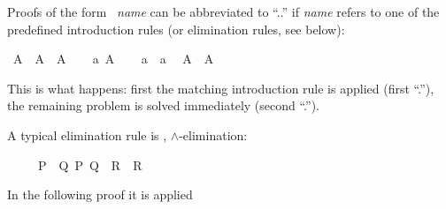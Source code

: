 \begin{isabellebody}
\begin{isamarkuptext}
Proofs of the form ~\emph{name}
can be abbreviated to ``..'' if \emph{name} refers to one of the
predefined introduction rules (or elimination rules, see below):%
\end{isamarkuptext}%
\isamarkuptrue%
\isamarkupfalse%
\ {}A\ {}\ A\ {}\ A{}\isanewline
%
\isadelimproof
%
\endisadelimproof
%
\isatagproof
{}\isamarkupfalse%
\isanewline
\ \ \isamarkupfalse%
\ a{}\ {}A{}\isanewline
\ \ \isamarkupfalse%
\ a\ \ a\ \isamarkupfalse%
\ {}A\ {}\ A{}\ \isamarkupfalse%
\isanewline
{}\isamarkupfalse%
%
\endisatagproof
{\isafoldproof}%
%
\isadelimproof
%
\endisadelimproof
%
\begin{isamarkuptext}%
\noindent
This is what happens: first the matching introduction rule 
is applied (first ``.''), the remaining problem is solved immediately (second ``.'').%
\end{isamarkuptext}%
\isamarkuptrue%
%
\isamarkuptrue%
%
\begin{isamarkuptext}%
A typical elimination rule is , $\land$-elimination:
\begin{isabelle}%
\ \ \ \ \ {}{}P\ {}\ {}Q{}\ {}{}P{}\ {}Q{}\ {}\ {}R{}\ {}\ {}R%
\end{isabelle}  In the following proof it is applied

\end{isamarkuptext}
\end{isabellebody}
